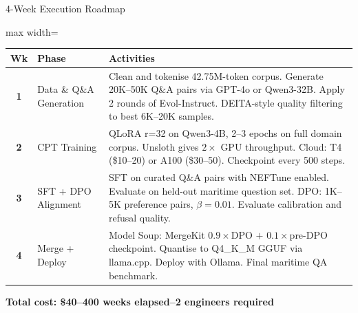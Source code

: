 \documentclass[aspectratio=169,11pt]{beamer}
\begin{document}
\begin{frame}[shrink=5]{4-Week Execution Roadmap}
\vspace{4pt}
\begin{adjustbox}{max width=\textwidth}
\begin{tabular}{@{}c p{2.6cm} p{11.5cm}@{}}
  \toprule
  \textbf{Wk} & \textbf{Phase} & \textbf{Activities}\\
  \midrule
  \rowcolor{navylight}
  \textbf{1} & Data \& Q\&A Generation &
    Clean and tokenise 42.75M-token corpus.
    Generate 20K--50K Q\&A pairs via GPT-4o or Qwen3-32B.
    Apply 2 rounds of Evol-Instruct.
    DEITA-style quality filtering to best 6K--20K samples.\vspace{2pt}\\
  \rowcolor{forestsoft}
  \textbf{2} & CPT Training &
    QLoRA r=32 on Qwen3-4B, 2--3 epochs on full domain corpus.
    Unsloth gives $2\times$ GPU throughput.
    Cloud: T4 (\$10--20) or A100 (\$30--50).
    Checkpoint every 500 steps.\vspace{2pt}\\
  \rowcolor{ambersoft}
  \textbf{3} & SFT + DPO Alignment &
    SFT on curated Q\&A pairs with NEFTune enabled.
    Evaluate on held-out maritime question set.
    DPO: 1K--5K preference pairs, $\beta=0.01$.
    Evaluate calibration and refusal quality.\vspace{2pt}\\
  \rowcolor{goldsoft}
  \textbf{4} & Merge + Deploy &
    Model Soup: MergeKit $0.9{\times}$DPO $+$ $0.1{\times}$pre-DPO checkpoint.
    Quantise to Q4\_K\_M GGUF via llama.cpp.
    Deploy with Ollama. Final maritime QA benchmark.\\
  \bottomrule
\end{tabular}
\end{adjustbox}
\vspace{8pt}
\begin{center}
  \colorbox{navylight}{%
    \small\bfseries\color{navydeep}\enspace
    Total cost: \$40--400\enspace\textbullet{} weeks elapsed\enspace\textbullet{}--2 engineers required\enspace}
\end{center}
\end{frame}
\end{document}
